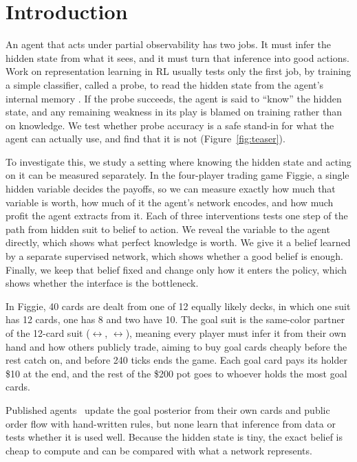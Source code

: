 \documentclass{article}
\newcommand{\Spade}{\ding{171}}
\newcommand{\Club}{\ding{168}}
\newcommand{\Heart}{\textcolor{red!75!black}{\ding{170}}}
\newcommand{\Diam}{\textcolor{red!75!black}{\ding{169}}}
\begin{document}
\section{Introduction}
\label{sec:intro}

An agent that acts under partial observability has two jobs. It must infer the hidden state from what it sees, and it must turn that inference into good actions. Work on representation learning in RL usually tests only the first job, by training a simple classifier, called a probe, to read the hidden state from the agent's internal memory \cite{alain2016probes,gregor2019belief,mcgrath2022alphazero}. If the probe succeeds, the agent is said to ``know'' the hidden state, and any remaining weakness in its play is blamed on training rather than on knowledge. We test whether probe accuracy is a safe stand-in for what the agent can actually use, and find that it is not (Figure~\ref{fig:teaser}). %

To investigate this, we study a setting where knowing the hidden state and acting on it can be measured separately. In the four-player trading game Figgie, a single hidden variable decides the payoffs, so we can measure exactly how much that variable is worth, how much of it the agent's network encodes, and how much profit the agent extracts from it. Each of three interventions tests one step of the path from hidden suit to belief to action. We reveal the variable to the agent directly, which shows what perfect knowledge is worth. We give it a belief learned by a separate supervised network, which shows whether a good belief is enough. Finally, we keep that belief fixed and change only how it enters the policy, which shows whether the interface is the bottleneck. %

In Figgie, 40 cards are dealt from one of 12 equally likely decks, in which one suit has 12 cards, one has 8 and two have 10.
The goal suit is the same-color partner of the 12-card suit (\Spade$\leftrightarrow$\Club, \Heart$\leftrightarrow$\Diam), meaning every player must infer it from their own hand and how others publicly trade, aiming to buy goal cards cheaply before the rest catch on, and before 240 ticks ends the game.
Each goal card pays its holder \$10 at the end, and the rest of the \$200 pot goes to whoever holds the most goal cards. %
\newpage

Published agents~\cite{figment,figgiebot,cs224r2025figgie} update the goal posterior from their own cards and public order flow with hand-written rules, but none learn that inference from data or tests whether it is used well.
Because the hidden state is tiny, the exact belief is cheap to compute and can be compared with what a network represents.
\end{document}
